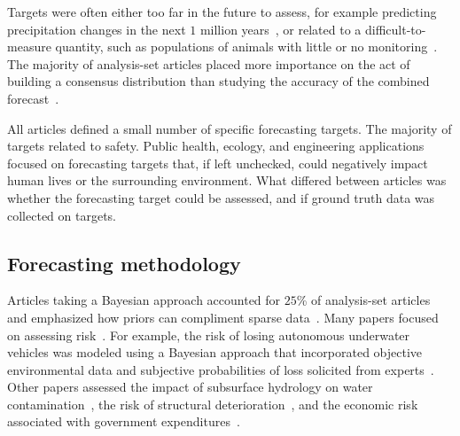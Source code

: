 \documentclass[preprint,authoryear]{elsarticle}
\begin{document}
Targets were often either too far in the future to assess, for example predicting precipitation changes in the next $1$ million years~\citep{zio1997accounting}, or related to a difficult-to-measure quantity, such as populations of animals with little or no monitoring~\cite{johnson2018making,borsuk2004predictive,mantyka2014understanding}.
The majority of analysis-set articles placed more importance on the act of building a consensus distribution than studying the accuracy of the combined forecast~\citep{johnson2018making,cooke2014out,li2012preliminary,klas2010support,zio1997accounting,song2013combining,clemen2007advances,tartakovsky2007probabilistic,morgan2014use,borsuk2004predictive,kabak2008aggregating,cabello2012combination,adams2009acceptability,neves2008life,failing2004using,evans1994use,hora2015calibration,abramson1996hailfinder,hathout2016uncertainty,wang2008probabilistic,mantyka2014understanding,kurowicka2010probabilistic,zio1996use,brito2016bayesian,gu2016expert,mu1999multi,wang2018bayesian,shin2013robust,brito2012behavioral,baron2014two}.

All articles defined a small number of specific forecasting targets.
The majority of targets related to safety.
Public health, ecology, and engineering applications focused on forecasting targets that, if left unchecked, could negatively impact human lives or the surrounding environment.
What differed between articles was whether the forecasting target could be assessed, and if ground truth data was collected on targets.

\subsection{Forecasting methodology}

Articles taking a Bayesian approach accounted for $25$\% of analysis-set articles and emphasized how priors can compliment sparse data~\citep{zio1997accounting,bolger2017deriving,ISI:000296286100010,tartakovsky2007probabilistic,huang2016improving,neves2008life,abramson1996hailfinder,ren2002optimal,mantyka2014understanding,brito2016bayesian,wang2018bayesian,brito2012behavioral}.
Many papers focused on assessing risk~\citep{zio1997accounting,brito2016bayesian,brito2012behavioral,tartakovsky2007probabilistic}.
For example, the risk of losing autonomous underwater vehicles was modeled using a Bayesian approach that incorporated objective environmental data and subjective probabilities of loss solicited from experts~\citep{brito2016bayesian,brito2012behavioral}.
Other papers assessed the impact of subsurface hydrology on water contamination~\citep{tartakovsky2007probabilistic}, the risk of structural deterioration~\cite{neves2008life}, and the economic risk associated with government expenditures~\cite{wang2018bayesian}.
\end{document}
